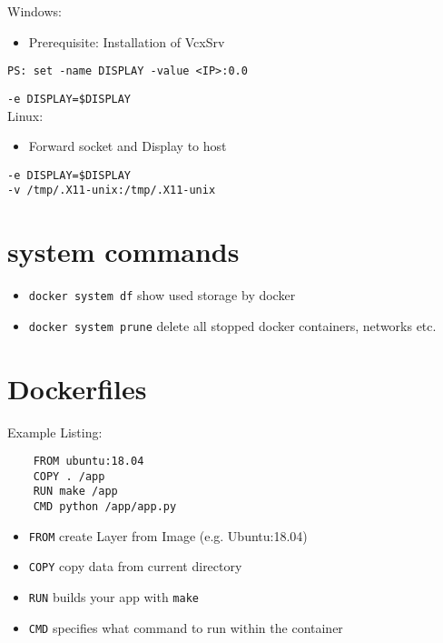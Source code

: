 \documentclass[landscape]{article}
\begin{document}
\begin{multicols*}{3}
\vspace{1.75cm}
\begin{tcolorbox}[title=Forwarding GUI elements]
	\textsf{Windows:}
	\begin{itemize}
		\item \textsf{Prerequisite: Installation of VcxSrv}	
	\end{itemize}
	\texttt{PS: set -name DISPLAY -value <IP>:0.0}
	
	\texttt{-e DISPLAY=\$DISPLAY}\\
	
	\textsf{Linux:}
	\begin{itemize}
		\item \textsf{Forward socket and Display to host}	
	\end{itemize}
	\texttt{-e DISPLAY=\$DISPLAY}\\
	\texttt{-v /tmp/.X11-unix:/tmp/.X11-unix}
\end{tcolorbox}

\section*{system commands}
\begin{itemize}
	\item \texttt{docker system df}
	\subitem \textsf{show used storage by docker}
	\item \texttt{docker system prune}
	\subitem \textsf{delete all stopped docker containers, networks etc.}
\end{itemize}

\vspace{0.5cm}
\section*{Dockerfiles}
\textsf{Example Listing:}
\begin{lstlisting}
	FROM ubuntu:18.04
	COPY . /app
	RUN make /app
	CMD python /app/app.py
\end{lstlisting}
\begin{itemize}
	\item \texttt{FROM}
	\subitem \textsf{create Layer from Image (e.g. Ubuntu:18.04)}
	\item \texttt{COPY}
	\subitem \textsf{copy data from current directory}
	\item \texttt{RUN}
	\subitem \textsf{builds your app with \texttt{make}}
	\item \texttt{CMD}
	\subitem \textsf{specifies what command to run within the container}
\end{itemize}
\vspace{0.2cm}

\end{multicols*}
\end{document}
